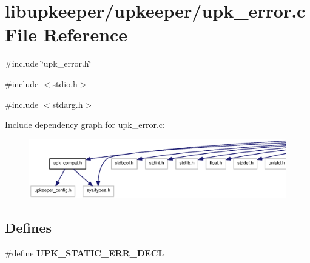 \section{libupkeeper/upkeeper/upk\_\-error.c File Reference}
\label{upk__error_8c}
{\ttfamily \#include \char`\"{}upk\_\-error.h\char`\"{}}\par
{\ttfamily \#include $<$stdio.h$>$}\par
{\ttfamily \#include $<$stdarg.h$>$}\par
Include dependency graph for upk\_\-error.c:
\nopagebreak
\begin{figure}[H]
\begin{center}
\leavevmode
\includegraphics[width=400pt]{upk__error_8c__incl}
\end{center}
\end{figure}
\subsection*{Defines}
\begin{DoxyCompactItemize}
\item 
\#define {\bf UPK\_\-STATIC\_\-ERR\_\-DECL}
\end{DoxyCompactItemize}
